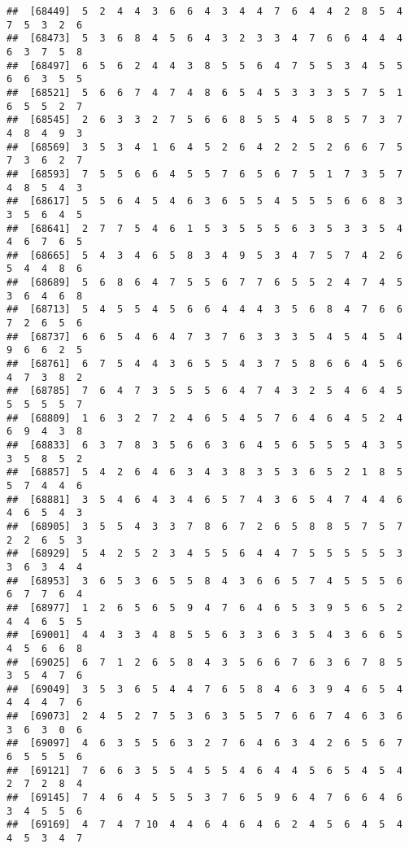 \documentclass[
]{book}
\begin{document}
\begin{verbatim}
##  [68449]  5  2  4  4  3  6  6  4  3  4  4  7  6  4  4  2  8  5  4  7  5  3  2  6
##  [68473]  5  3  6  8  4  5  6  4  3  2  3  3  4  7  6  6  4  4  4  6  3  7  5  8
##  [68497]  6  5  6  2  4  4  3  8  5  5  6  4  7  5  5  3  4  5  5  6  6  3  5  5
##  [68521]  5  6  6  7  4  7  4  8  6  5  4  5  3  3  3  5  7  5  1  6  5  5  2  7
##  [68545]  2  6  3  3  2  7  5  6  6  8  5  5  4  5  8  5  7  3  7  4  8  4  9  3
##  [68569]  3  5  3  4  1  6  4  5  2  6  4  2  2  5  2  6  6  7  5  7  3  6  2  7
##  [68593]  7  5  5  6  6  4  5  5  7  6  5  6  7  5  1  7  3  5  7  4  8  5  4  3
##  [68617]  5  5  6  4  5  4  6  3  6  5  5  4  5  5  5  6  6  8  3  3  5  6  4  5
##  [68641]  2  7  7  5  4  6  1  5  3  5  5  5  6  3  5  3  3  5  4  4  6  7  6  5
##  [68665]  5  4  3  4  6  5  8  3  4  9  5  3  4  7  5  7  4  2  6  5  4  4  8  6
##  [68689]  5  6  8  6  4  7  5  5  6  7  7  6  5  5  2  4  7  4  5  3  6  4  6  8
##  [68713]  5  4  5  5  4  5  6  6  4  4  4  3  5  6  8  4  7  6  6  7  2  6  5  6
##  [68737]  6  6  5  4  6  4  7  3  7  6  3  3  3  5  4  5  4  5  4  9  6  6  2  5
##  [68761]  6  7  5  4  4  3  6  5  5  4  3  7  5  8  6  6  4  5  6  4  7  3  8  2
##  [68785]  7  6  4  7  3  5  5  5  6  4  7  4  3  2  5  4  6  4  5  5  5  5  5  7
##  [68809]  1  6  3  2  7  2  4  6  5  4  5  7  6  4  6  4  5  2  4  6  9  4  3  8
##  [68833]  6  3  7  8  3  5  6  6  3  6  4  5  6  5  5  5  4  3  5  3  5  8  5  2
##  [68857]  5  4  2  6  4  6  3  4  3  8  3  5  3  6  5  2  1  8  5  5  7  4  4  6
##  [68881]  3  5  4  6  4  3  4  6  5  7  4  3  6  5  4  7  4  4  6  4  6  5  4  3
##  [68905]  3  5  5  4  3  3  7  8  6  7  2  6  5  8  8  5  7  5  7  2  2  6  5  3
##  [68929]  5  4  2  5  2  3  4  5  5  6  4  4  7  5  5  5  5  5  3  3  6  3  4  4
##  [68953]  3  6  5  3  6  5  5  8  4  3  6  6  5  7  4  5  5  5  6  6  7  7  6  4
##  [68977]  1  2  6  5  6  5  9  4  7  6  4  6  5  3  9  5  6  5  2  4  4  6  5  5
##  [69001]  4  4  3  3  4  8  5  5  6  3  3  6  3  5  4  3  6  6  5  4  5  6  6  8
##  [69025]  6  7  1  2  6  5  8  4  3  5  6  6  7  6  3  6  7  8  5  3  5  4  7  6
##  [69049]  3  5  3  6  5  4  4  7  6  5  8  4  6  3  9  4  6  5  4  4  4  4  7  6
##  [69073]  2  4  5  2  7  5  3  6  3  5  5  7  6  6  7  4  6  3  6  3  6  3  0  6
##  [69097]  4  6  3  5  5  6  3  2  7  6  4  6  3  4  2  6  5  6  7  6  5  5  5  6
##  [69121]  7  6  6  3  5  5  4  5  5  4  6  4  4  5  6  5  4  5  4  2  7  2  8  4
##  [69145]  7  4  6  4  5  5  5  3  7  6  5  9  6  4  7  6  6  4  6  3  4  5  5  6
##  [69169]  4  7  4  7 10  4  4  6  4  6  4  6  2  4  5  6  4  5  4  4  5  3  4  7

\end{verbatim}
\end{document}
